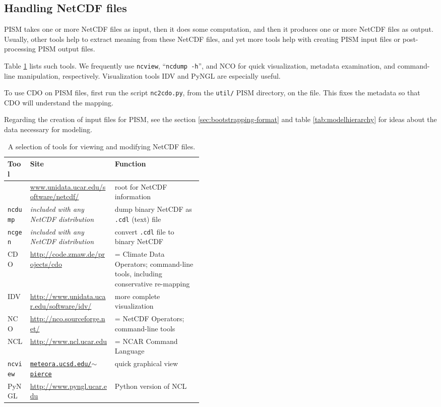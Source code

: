 \subsection{Handling NetCDF files}\label{subsect:nctoolsintro}  PISM takes one or more NetCDF files as input, then it does some computation, and then it produces one or more NetCDF files as output.  Usually, other tools help to extract meaning from these NetCDF files, and yet more tools help with creating PISM input files or post-processing PISM output files.

Table \ref{tab:NetCDFview} lists such tools.  We frequently use \texttt{ncview}, ``\texttt{ncdump -h}'', and NCO for quick visualization, metadata examination, and command-line manipulation, respectively.  Visualization tools IDV and PyNGL are especially useful.  

To use CDO on PISM files, first run the script \texttt{nc2cdo.py}, from the \texttt{util/} PISM directory, on the file.  This fixes the metadata so that CDO will understand the mapping.

Regarding the creation of input files for PISM, see the section \ref{sec:bootstrapping-format} and table \ref{tab:modelhierarchy} for ideas about the data necessary for modeling.

\newcommand{\netcdftool}[1]{#1\index{NetCDF!tools!#1}}
\begin{table}[ht]
\centering
\small
\begin{tabular}{llp{0.45\linewidth}}
  \toprule
  \textbf{Tool} & \textbf{Site} & \textbf{Function} \\
  \midrule
  & \url{www.unidata.ucar.edu/software/netcdf/} & root for NetCDF information \\
  \midrule
  \netcdftool{\texttt{ncdump}} & \emph{included with any NetCDF distribution} & dump binary NetCDF as \texttt{.cdl} (text) file \\
  \netcdftool{\texttt{ncgen}} & \emph{included with any NetCDF distribution} & convert \texttt{.cdl} file to binary NetCDF \\
  \midrule
  \netcdftool{CDO} & \url{http://code.zmaw.de/projects/cdo} & = Climate Data Operators; command-line tools, including conservative re-mapping \\
  \netcdftool{IDV} & \url{http://www.unidata.ucar.edu/software/idv/} & more complete visualization \\
  \netcdftool{NCO}\index{NCO (NetCDF Operators)} & \url{http://nco.sourceforge.net/} & = NetCDF Operators; command-line tools\\
  \netcdftool{NCL} &  \url{http://www.ncl.ucar.edu} & = NCAR Command Language\\
  \netcdftool{\texttt{ncview}} & \href{http://meteora.ucsd.edu/~pierce/ncview_home_page.html}{\texttt{meteora.ucsd.edu/$\sim$pierce}} & quick graphical view \\
  \netcdftool{PyNGL} &  \url{http://www.pyngl.ucar.edu} & Python version of NCL\\
  \bottomrule
\end{tabular}
\normalsize
\caption{A selection of tools for viewing and modifying NetCDF files.}
\label{tab:NetCDFview}
\end{table}




